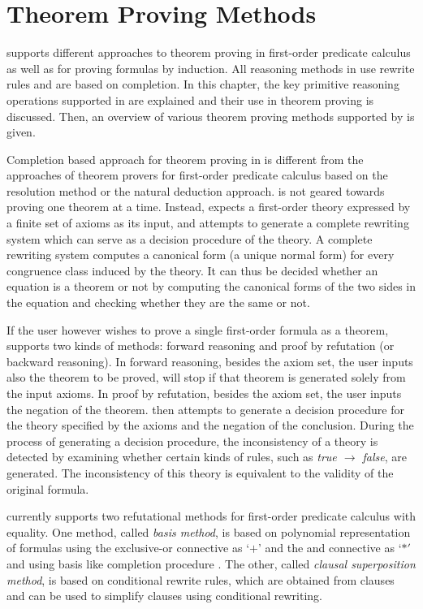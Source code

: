 \chapter{Theorem Proving Methods}

\RRL supports different approaches
to theorem proving in first-order predicate calculus as well as
for proving formulas by induction. All reasoning methods in \RRL
use rewrite rules and are based on completion. In this chapter,
the key primitive reasoning operations supported in \RRL are
explained and their use in theorem proving is discussed.  Then,
an overview of various theorem proving methods supported by \RRL
is given.

Completion based approach for theorem proving in \RRL is
different from the approaches of theorem provers for first-order
predicate calculus based on the resolution method or the natural
deduction approach. \RRL is not geared towards proving one
theorem at a time. Instead, \RRL expects a first-order theory
expressed by a finite set of axioms as its input, and attempts
to generate a complete rewriting system which can
serve as a decision procedure of the theory.  
A complete rewriting system
computes a canonical form (a unique normal form) for every
congruence class induced by the theory.  It can thus be decided
whether an equation is a theorem or not by computing the
canonical forms of the two sides in the equation and checking
whether they are the same or not.

If the user however wishes to prove a single first-order formula
as a theorem, \RRL supports two kinds of methods: forward
reasoning and proof by refutation (or backward reasoning).  In
forward reasoning, besides the axiom set, the user inputs also
the theorem to be proved, \RRL will stop if that theorem is
generated solely from the input axioms.  In proof by refutation,
besides the axiom set, the user inputs the negation of the
theorem.  \RRL then attempts to generate a decision procedure for
the theory specified by the axioms and the negation of the
conclusion. During the process of generating a decision
procedure, the inconsistency of a theory is detected by examining
whether certain kinds of rules, such as {\em true $\rightarrow$
false}, are generated.  The inconsistency of this theory is
equivalent to the validity of the original formula.

\RRL currently supports two refutational methods
for first-order predicate calculus with equality.  One method,
called {\it \Groebner basis method}, is based on polynomial
representation of formulas using the exclusive-or connective as
`$+$' and the and connective as `$*'$ and using \Groebner basis
like completion procedure \cite{KN85}.  The other, called {\em
clausal superposition method}, is based on conditional rewrite
rules, which are obtained from clauses and can be used to
simplify clauses using conditional rewriting.

